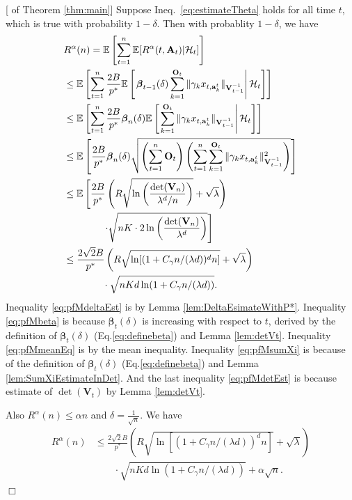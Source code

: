 \documentclass{article}
\newcommand{\bbeta}{\boldsymbol{\beta}}
\newcommand{\EE}{\mathbb{E}}
\newcommand{\bA}{\mathbf{A}}
\newcommand{\ba}{\mathbf{a}}
\newcommand{\bO}{\mathbf{O}}
\newcommand{\bV}{\mathbf{V}}
\newcommand{\cH}{\mathcal{H}}
\newcommand{\norm}[1]{\| #1 \|}
\newenvironment{proof}{\noindent {\textbf{Proof. }}}{$\Box$ \medskip}
\begin{document}
\begin{proof}[ of Theorem \ref{thm:main}]
	Suppose Ineq.~\eqref{eq:estimateTheta} holds for all time $t$, which is true with probability $1-\delta$. Then with probablity $1-\delta$, we have
	\begin{align}
	&R^{\alpha}(n) = \EE \left[\sum_{t=1}^{n} \EE[R^{\alpha}(t, \bA_t) | \cH_t] \right] \notag\\
	&\leq \EE\left[\sum_{t=1}^{n} \frac{2B}{p^*} \EE \left[ \left. \bbeta_{t-1}(\delta) \sum_{k=1}^{\bO_t}\norm{\gamma_k x_{t,\ba_k^t}}_{\bV_{t-1}^{-1}}\right| \cH_t \right] \right] \label{eq:pfMdeltaEst}\\
	&\leq \EE\left[\sum_{t=1}^{n} \frac{2B}{p^*} \bbeta_{n}(\delta) \EE \left[ \left. \sum_{k=1}^{\bO_t}\norm{\gamma_k x_{t,\ba_k^t}}_{\bV_{t-1}^{-1}} \right| \cH_t \right] \right] \label{eq:pfMbeta}\\
	&\leq \EE \left[\frac{2B}{p^*} \bbeta_n(\delta) \sqrt{\left(\sum_{t=1}^{n} \bO_t\right) \left( \sum_{t=1}^{n} \sum_{k=1}^{\bO_t}\norm{\gamma_k x_{t,\ba_k^t}}_{\bV_{t-1}^{-1}}^2 \right)} \right ]  \label{eq:pfMmeanEq}\\
	&\leq \EE\left[\frac{2B}{p^*} \left( R \sqrt{ \ln \left( \frac{\det(\bV_n)}{\lambda^d / n} \right)} + \sqrt{\lambda} \right) \right. \notag\\
	& \left. \qquad \qquad \cdot \sqrt{nK \cdot 2\ln \left(\frac{\det(\bV_n)}{\lambda^d} \right)} \right] \label{eq:pfMsumXi}\\
	&\leq \frac{2\sqrt{2}B}{p^*} \left(R\sqrt{ \ln[ (1 + C_\gamma n/(\lambda d))^d n ]} + \sqrt{\lambda} \right) \notag\\
	&\qquad \qquad \cdot \sqrt{nKd\ln(1 + C_\gamma n/(\lambda d))}. \label{eq:pfMdetEst}
	\end{align}
	Inequality \eqref{eq:pfMdeltaEst} is by Lemma \ref{lem:DeltaEsimateWithP*}. 
	Inequality \eqref{eq:pfMbeta} is because $\bbeta_{t}(\delta)$ is increasing with respect to $t$, derived by the definition of $\bbeta_t(\delta)$ (Eq.\eqref{eq:definebeta}) and Lemma \ref{lem:detVt}. 
	Inequality \eqref{eq:pfMmeanEq} is by the mean inequality. 
	Inequality \eqref{eq:pfMsumXi} is because of the definition of $\bbeta_t(\delta)$ (Eq.\eqref{eq:definebeta}) and Lemma \ref{lem:SumXiEstimateInDet}. 
	And the last inequality \eqref{eq:pfMdetEst} is because estimate of $\det(\bV_t)$ by Lemma \ref{lem:detVt}.
	
	Also $R^{\alpha}(n) \leq \alpha n$ and $\delta = \frac{1}{\sqrt{n}}$. We have 
	\begin{align*}
		R^{\alpha}(n) &\leq \frac{2\sqrt{2}B}{p^*} \left(R\sqrt{ \ln[ (1 + C_\gamma n/(\lambda d))^d n ]} + \sqrt{\lambda} \right) \\
		&\qquad \cdot \sqrt{nKd\ln(1 + C_\gamma n/(\lambda d))} + \alpha \sqrt{n}.
	\end{align*}
\end{proof}
\end{document}
